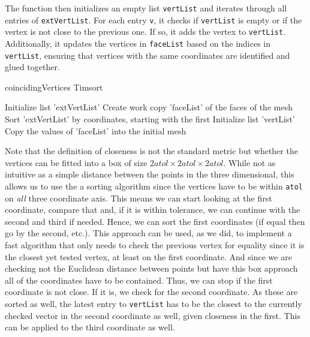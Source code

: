 The function then initializes an empty list \texttt{vertList} and iterates through all entries of \texttt{extVertList}. For each entry \texttt{v}, it checks if \texttt{vertList} is empty or if the vertex is not close to the previous one. If so, it adds the vertex to \texttt{vertList}. Additionally, it updates the vertices in \texttt{faceList} based on the indices in \texttt{vertList}, ensuring that vertices with the same coordinates are identified and glued together.

\begin{algorithm}[H]
    \SetAlgoLined

    \caption{coincidingVertices Timsort}
    \label{alg:coincidingVertices_timsort}
    Initialize list 'extVertList'\;
    Create work copy 'faceList' of the faces of the mesh\;
    Sort 'extVertList' by coordinates, starting with the first\;
    Initialize list 'vertList'\;
    Copy the values of 'faceList' into the initial mesh\;
\end{algorithm}

Note that the definition of closeness is not the standard metric but whether the vertices can be fitted into a box of size $2\textit{atol} \times 2\textit{atol} \times 2\textit{atol}$. While not as intuitive as a simple distance between the points in the three dimensional, this allows us to use the a sorting algorithm since the vertices have to be within \texttt{atol} on \textit{all} three coordinate axis. This means we can start looking at the first coordinate, compare that and, if it is within tolerance, we can continue with the second and third if needed. Hence, we can sort the first coordinates (if equal then go by the second, etc.). This approach can be used, as we did, to implement a fast algorithm that only needs to check the previous vertex for equality since it is the closest yet tested vertex, at least on the first coordinate. And since we are checking not the Euclidean distance between points but have this box approach all of the coordinates have to be contained. Thus, we can stop if the first coordinate is not close. If it is, we check for the second coordinate. As these are sorted as well, the latest entry to \texttt{vertList} has to be the closest to the currently checked vector in the second coordinate as well, given closeness in the first. This can be applied to the third coordinate as well.


